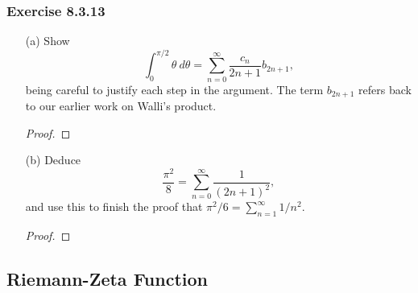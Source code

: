 \subsubsection{Exercise 8.3.13} 
\begin{enumerate}
    \item[(a)] Show 
        \[  \int_{ 0 }^{ \pi /2    }  \theta  \  d \theta = \sum_{ n=0 }^{ \infty  } \frac{ c_{n}  }{  2n+1  }  b_{2n+1},   \] being careful to justify each step in the argument. The term \( b_{2n+1} \) refers back to our earlier work on Walli's product.
        \begin{proof}
        
        \end{proof}
    \item[(b)] Deduce 
        \[  \frac{ \pi^{2}  }{  8  } = \sum_{ n=0  }^{ \infty  } \frac{ 1 }{ (2n+1)^{2} },  \] and use this to finish the proof that \( \pi^{2} / 6  = \sum_{ n=1 }^{ \infty  } 1 / n^{2} \).
        \begin{proof}
        
        \end{proof}
\end{enumerate}

\subsection{Riemann-Zeta Function}








